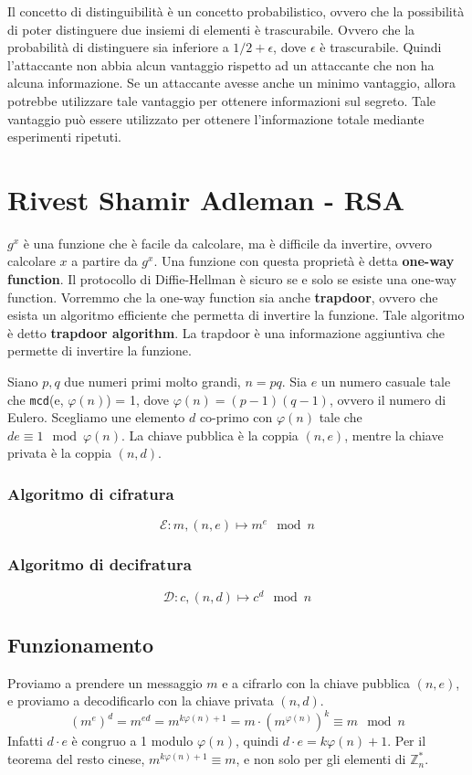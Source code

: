 Il concetto di distinguibilità è un concetto probabilistico, ovvero che la possibilità di poter 
distinguere due insiemi di elementi è trascurabile. Ovvero che la probabilità di distinguere 
sia inferiore a $1/2 + \epsilon$, dove $\epsilon$ è trascurabile. Quindi l'attaccante non abbia 
alcun vantaggio rispetto ad un attaccante che non ha alcuna informazione.
Se un attaccante avesse anche un minimo vantaggio, allora potrebbe utilizzare tale vantaggio per
ottenere informazioni sul segreto. Tale vantaggio può essere utilizzato per ottenere l'informazione 
totale mediante esperimenti ripetuti.

\section{Rivest Shamir Adleman - RSA}
$g^x$ è una funzione che è facile da calcolare, ma è difficile da invertire, ovvero calcolare $x$
a partire da $g^x$. Una funzione con questa proprietà è detta \textbf{one-way function}. Il protocollo di 
Diffie-Hellman è sicuro se e solo se esiste una one-way function.
Vorremmo che la one-way function sia anche \textbf{trapdoor}, ovvero che esista un algoritmo 
efficiente che permetta di invertire la funzione. Tale algoritmo è detto \textbf{trapdoor algorithm}.
La trapdoor è una informazione aggiuntiva che permette di invertire la funzione.

Siano $p, q$ due numeri primi molto grandi, $n = pq$. Sia $e$ un numero casuale tale che 
\texttt{mcd}(e, $\varphi(n)$) = 1, dove $\varphi(n) = (p-1)(q-1)$, ovvero il numero di Eulero. Scegliamo 
une elemento $d$ co-primo con $\varphi(n)$ tale che $de \equiv 1 \mod \varphi(n)$.
La chiave pubblica è la coppia $(n, e)$, mentre la chiave privata è la coppia $(n, d)$.
\subsubsection{Algoritmo di cifratura}
\[
  \mathcal{E}: m, (n, e) \mapsto m^e \mod n  
\]
\subsubsection{Algoritmo di decifratura}
\[
  \mathcal{D}: c, (n, d) \mapsto c^d \mod n
\]
\subsection{Funzionamento}
Proviamo a prendere un messaggio $m$ e a cifrarlo con la chiave pubblica $(n, e)$,
e proviamo a decodificarlo con la chiave privata $(n, d)$.
\[
  (m^e)^d = m^{ed} = m^{k\varphi(n) + 1} = m \cdot (m^{\varphi(n)})^k \equiv m \mod n  
\]
Infatti $d\cdot e$ è congruo a 1 modulo $\varphi(n)$, quindi $d\cdot e = k\varphi(n) + 1$.
Per il teorema del resto cinese, $m^{k\varphi(n) + 1} \equiv m$, e non solo per gli elementi 
di $\mathbb{Z}_n^*$.

